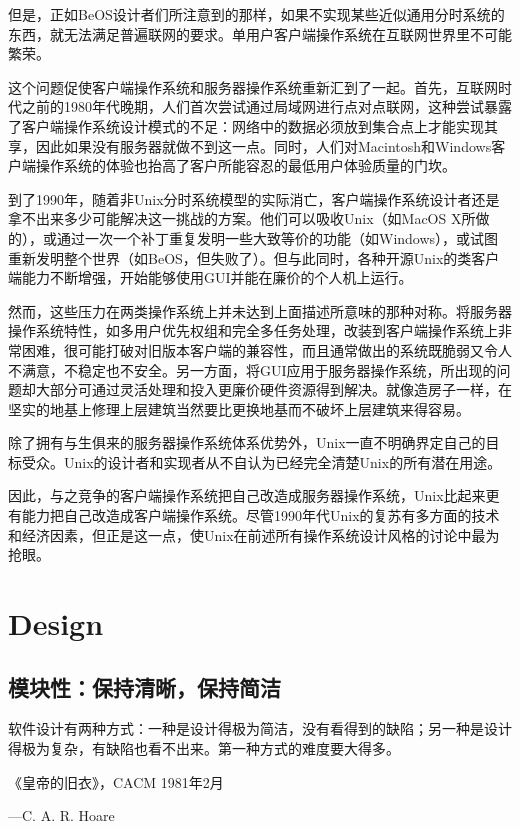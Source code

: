 \documentclass[12pt,oneside]{book}
\begin{document}
但是，正如BeOS设计者们所注意到的那样，如果不实现某些近似通用分时系统的东西，就无法满足普遍联网的要求。单用户客户端操作系统在互联网世界里不可能繁荣。

这个问题促使客户端操作系统和服务器操作系统重新汇到了一起。首先，互联网时代之前的1980年代晚期，人们首次尝试通过局域网进行点对点联网，这种尝试暴露了客户端操作系统设计模式的不足：网络中的数据必须放到集合点上才能实现其享，因此如果没有服务器就做不到这一点。同时，人们对Macintosh和Windows客户端操作系统的体验也抬高了客户所能容忍的最低用户体验质量的门坎。

到了1990年，随着非Unix分时系统模型的实际消亡，客户端操作系统设计者还是拿不出来多少可能解决这一挑战的方案。他们可以吸收Unix（如MacOS X所做的），或通过一次一个补丁重复发明一些大致等价的功能（如Windows），或试图重新发明整个世界（如BeOS，但失败了）。但与此同时，各种开源Unix的类客户端能力不断增强，开始能够使用GUI并能在廉价的个人机上运行。

然而，这些压力在两类操作系统上并未达到上面描述所意味的那种对称。将服务器操作系统特性，如多用户优先权组和完全多任务处理，改装到客户端操作系统上非常困难，很可能打破对旧版本客户端的兼容性，而且通常做出的系统既脆弱又令人不满意，不稳定也不安全。另一方面，将GUI应用于服务器操作系统，所出现的问题却大部分可通过灵活处理和投入更廉价硬件资源得到解决。就像造房子一样，在坚实的地基上修理上层建筑当然要比更换地基而不破坏上层建筑来得容易。

除了拥有与生俱来的服务器操作系统体系优势外，Unix一直不明确界定自己的目标受众。Unix的设计者和实现者从不自认为已经完全清楚Unix的所有潜在用途。

因此，与之竞争的客户端操作系统把自己改造成服务器操作系统，Unix比起来更有能力把自己改造成客户端操作系统。尽管1990年代Unix的复苏有多方面的技术和经济因素，但正是这一点，使Unix在前述所有操作系统设计风格的讨论中最为抢眼。


\part{Design}
\chapter{模块性：保持清晰，保持简洁}
\begin{flushright}
软件设计有两种方式：一种是设计得极为简洁，没有看得到的缺陷；另一种是设计得极为复杂，有缺陷也看不出来。第一种方式的难度要大得多。

{\hfill 《皇帝的旧衣》，CACM 1981年2月}

{\hfill —C. A. R. Hoare}
\end{flushright}
\end{document}
